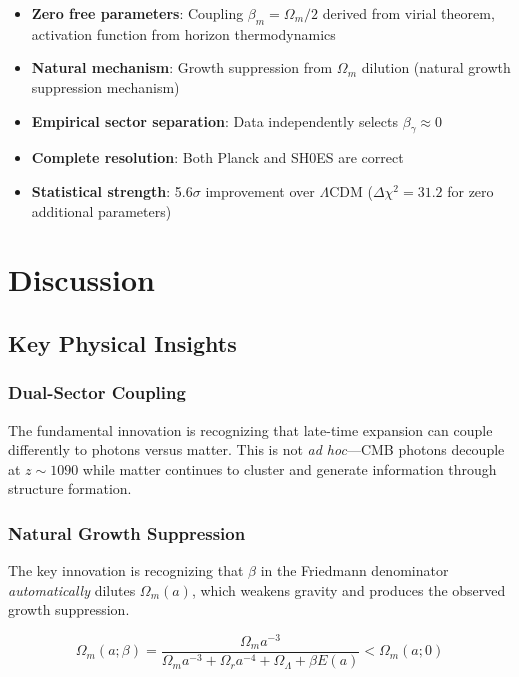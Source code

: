 \documentclass[11pt,letterpaper]{article}
\begin{document}
\begin{itemize}
\item \textbf{Zero free parameters}: Coupling $\beta_m = \Omega_m/2$ derived from virial theorem, activation function from horizon thermodynamics
\item \textbf{Natural mechanism}: Growth suppression from $\Omega_m$ dilution (natural growth suppression mechanism)
\item \textbf{Empirical sector separation}: Data independently selects $\beta_\gamma \approx 0$
\item \textbf{Complete resolution}: Both Planck and SH0ES are correct
\item \textbf{Statistical strength}: 5.6$\sigma$ improvement over $\Lambda$CDM ($\Delta\chi^2 = 31.2$ for zero additional parameters)
\end{itemize}

\section{Discussion}

\subsection{Key Physical Insights}

\subsubsection{Dual-Sector Coupling}

The fundamental innovation is recognizing that late-time expansion can couple differently to photons versus matter. This is not \textit{ad hoc}---CMB photons decouple at $z \sim 1090$ while matter continues to cluster and generate information through structure formation.

\subsubsection{Natural Growth Suppression}

The key innovation is recognizing that $\beta$ in the Friedmann denominator \textit{automatically} dilutes $\Omega_m(a)$, which weakens gravity and produces the observed growth suppression.

\begin{equation}
\Omega_m(a; \beta) = \frac{\Omega_m a^{-3}}{\Omega_m a^{-3} + \Omega_r a^{-4} + \Omega_\Lambda + \beta E(a)} < \Omega_m(a; 0)
\end{equation}
\end{document}
